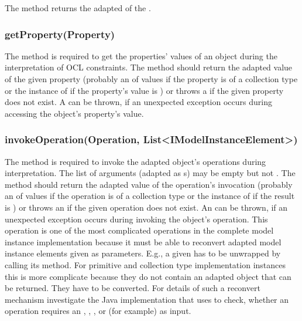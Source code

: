 The method  returns the adapted  of the 
.

\subsubsection{getProperty(Property)}

The method  is required to get the properties'
values of an object during the interpretation of \acs{OCL} constraints. The
method should return the adapted value of the given property (probably an 
 of values if the property is of a collection
type or the instance of  if the property's value is 
) or throws a  if the 
given property does not exist. A  can be thrown, 
if an unexpected exception occurs during accessing the object's property's 
value.

\subsubsection{invokeOperation(Operation, List<IModelInstanceElement>)}
			
The method  is 
required to invoke the adapted object's operations during interpretation. The 
list of arguments (adapted as s) may be empty but
not . The method should return the adapted value of the operation's 
invocation (probably an  of values if the 
operation is of a collection type or the instance of 
if the result is ) or throws an  if the 
given operation does not exist. An  can be
thrown, if an unexpected exception occurs during invoking the object's
operation. This operation is one of the most complicated operations in the 
complete model instance implementation because it must be able to reconvert 
adapted model instance elements given as parameters. E.g., a given 
 has to be unwrapped by calling its 
 method. For primitive and collection type implementation 
instances this is more complicate because they do not contain an adapted object 
that can be returned. They have to be converted. For details of such a reconvert
mechanism investigate the Java implementation that uses  to check, whether an operation requires an , 
, , or  (for example) as input.


